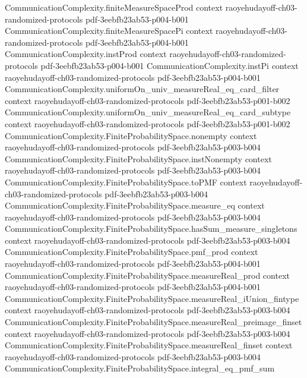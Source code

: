 \begin{theorem}
\proofstep
  {CommunicationComplexity.finiteMeasureSpaceProd}
  {context}
  {raoyehudayoff-ch03-randomized-protocols}
  {pdf-3eebfb23ab53-p004-b001}
\proofstep
  {CommunicationComplexity.finiteMeasureSpacePi}
  {context}
  {raoyehudayoff-ch03-randomized-protocols}
  {pdf-3eebfb23ab53-p004-b001}
\proofstep
  {CommunicationComplexity.instProd}
  {context}
  {raoyehudayoff-ch03-randomized-protocols}
  {pdf-3eebfb23ab53-p004-b001}
\proofstep
  {CommunicationComplexity.instPi}
  {context}
  {raoyehudayoff-ch03-randomized-protocols}
  {pdf-3eebfb23ab53-p004-b001}
\proofstep
  {CommunicationComplexity.uniformOn_univ_measureReal_eq_card_filter}
  {context}
  {raoyehudayoff-ch03-randomized-protocols}
  {pdf-3eebfb23ab53-p001-b002}
\proofstep
  {CommunicationComplexity.uniformOn_univ_measureReal_eq_card_subtype}
  {context}
  {raoyehudayoff-ch03-randomized-protocols}
  {pdf-3eebfb23ab53-p001-b002}
\proofstep
  {CommunicationComplexity.FiniteProbabilitySpace.nonempty}
  {context}
  {raoyehudayoff-ch03-randomized-protocols}
  {pdf-3eebfb23ab53-p003-b004}
\proofstep
  {CommunicationComplexity.FiniteProbabilitySpace.instNonempty}
  {context}
  {raoyehudayoff-ch03-randomized-protocols}
  {pdf-3eebfb23ab53-p003-b004}
\proofstep
  {CommunicationComplexity.FiniteProbabilitySpace.toPMF}
  {context}
  {raoyehudayoff-ch03-randomized-protocols}
  {pdf-3eebfb23ab53-p003-b004}
\proofstep
  {CommunicationComplexity.FiniteProbabilitySpace.measure_eq}
  {context}
  {raoyehudayoff-ch03-randomized-protocols}
  {pdf-3eebfb23ab53-p003-b004}
\proofstep
  {CommunicationComplexity.FiniteProbabilitySpace.hasSum_measure_singletons}
  {context}
  {raoyehudayoff-ch03-randomized-protocols}
  {pdf-3eebfb23ab53-p003-b004}
\proofstep
  {CommunicationComplexity.FiniteProbabilitySpace.pmf_prod}
  {context}
  {raoyehudayoff-ch03-randomized-protocols}
  {pdf-3eebfb23ab53-p004-b001}
\proofstep
  {CommunicationComplexity.FiniteProbabilitySpace.measureReal_prod}
  {context}
  {raoyehudayoff-ch03-randomized-protocols}
  {pdf-3eebfb23ab53-p004-b001}
\proofstep
  {CommunicationComplexity.FiniteProbabilitySpace.measureReal_iUnion_fintype}
  {context}
  {raoyehudayoff-ch03-randomized-protocols}
  {pdf-3eebfb23ab53-p003-b004}
\proofstep
  {CommunicationComplexity.FiniteProbabilitySpace.measureReal_preimage_finset}
  {context}
  {raoyehudayoff-ch03-randomized-protocols}
  {pdf-3eebfb23ab53-p003-b004}
\proofstep
  {CommunicationComplexity.FiniteProbabilitySpace.measureReal_finset}
  {context}
  {raoyehudayoff-ch03-randomized-protocols}
  {pdf-3eebfb23ab53-p003-b004}
\proofstep
  {CommunicationComplexity.FiniteProbabilitySpace.integral_eq_pmf_sum}

\end{theorem}
